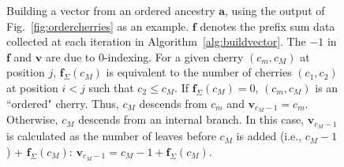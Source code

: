 \begin{figure}[htbp]
    \caption{Building a vector from an ordered ancestry $\bm{a}$, using the output of Fig.~\ref{fig:ordercherries} as an example. $\bm{f}$ denotes the prefix sum data collected at each iteration in Algorithm~\ref{alg:buildvector}. The $-1$ in $\bm{f}$ and $\bm{v}$ are due to 0-indexing. For a given cherry $(c_m, c_M)$ at position $j$, $\bm{f}_\Sigma(c_M)$ is equivalent to the number of cherries $(c_1, c_2)$ at position $i < j$ such that $c_2 \leq c_M$. If $\bm{f}_\Sigma(c_M) = 0$, $(c_m, c_M)$ is an ``ordered" cherry. Thus, $c_M$ descends from $c_m$ and $\bm{v}_{c_M-1} = c_m$. Otherwise, $c_M$ descends from an internal branch. In this case, $\bm{v}_{c_M-1}$ is calculated as the number of leaves before $c_M$ is added (i.e., $c_M - 1$) + $\bm{f}_\Sigma(c_M)$: $\bm{v}_{c_M-1} = c_M - 1 + \bm{f}_\Sigma(c_M)$.}
    \label{fig:build_vector}
\end{figure}